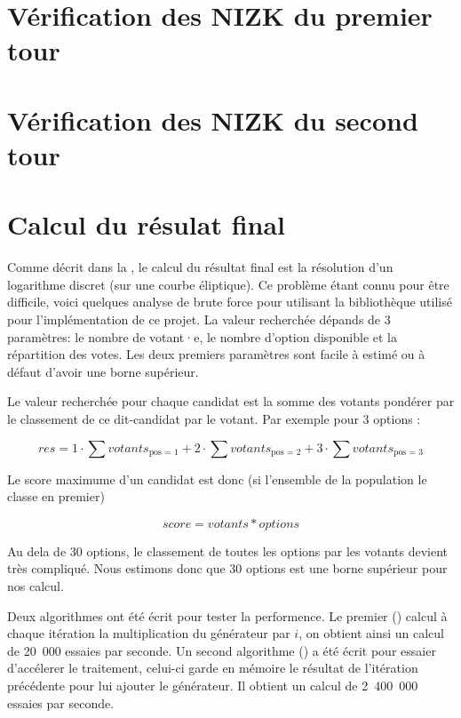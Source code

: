 \documentclass[../report]{subfiles}
\begin{document}
\section{Vérification des NIZK du premier tour}
\section{Vérification des NIZK du second tour}

\section{Calcul du résulat final}\label{sec:res:perf:resultat}

Comme décrit dans la , le calcul du résultat final est la résolution d'un logarithme discret (sur une courbe éliptique).
Ce problème étant connu pour être difficile, voici quelques analyse de brute force pour utilisant la bibliothèque utilisé
pour l'implémentation de ce projet.
La valeur recherchée dépands de 3 paramètres: le nombre de votant·e, le nombre d'option disponible et la répartition des votes.
Les deux premiers paramètres sont facile à estimé ou à défaut d'avoir une borne supérieur.

Le valeur recherchée pour chaque candidat est la somme des votants pondérer par le classement de ce dit-candidat par le votant.
Par exemple pour 3 options :

\[
  res = 1 \cdot \sum votants_{\text{pos = 1}}
      + 2 \cdot \sum votants_{\text{pos = 2}}
      + 3 \cdot \sum votants_{\text{pos = 3}}
\]

Le score maximume d'un candidat est donc (si l'ensemble de la population le classe en premier)

\[
  score = votants * options 
\]

Au dela de 30 options, le classement de toutes les options par les votants devient très compliqué.
Nous estimons donc que 30 options est une borne supérieur pour nos calcul.

Deux algorithmes ont été écrit pour tester la performence.
Le premier () calcul à chaque itération la multiplication du générateur 
par $i$, on obtient ainsi un calcul de 20~000 essaies par seconde.
Un second algorithme () a été écrit pour essaier d'accélerer le 
traitement, celui-ci garde en mémoire le résultat de l'itération précédente pour lui ajouter le générateur.
Il obtient un calcul de 2~400~000 essaies par seconde.
\end{document}
